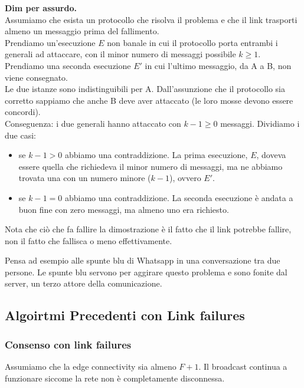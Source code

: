\textbf{Dim per assurdo.}\\
Assumiamo che esista un protocollo che risolva il problema e che il link trasporti almeno un messaggio prima del fallimento. \\
Prendiamo un'esecuzione $E$ non banale in cui il protocollo porta entrambi i generali ad attaccare, con il minor numero di messaggi possibile $k \geq 1$. \\
Prendiamo una seconda esecuzione $E'$ in cui l'ultimo messaggio, da A a B, non viene consegnato. \\
Le due istanze sono indistinguibili per A. Dall'assunzione che il protocollo sia corretto sappiamo che
anche B deve aver attaccato (le loro mosse devono essere concordi). \\
Conseguenza: i due generali hanno attaccato con $k-1 \geq 0$ messaggi.
Dividiamo i due casi:
\begin{itemize}
 \item se $k-1 > 0$ abbiamo una contraddizione. La prima esecuzione, $E$, doveva essere quella che richiedeva il minor numero di messaggi,
 ma ne abbiamo trovata una con un numero minore ($k-1$), ovvero $E'$.
 \item se $k-1 = 0$ abbiamo una contraddizione. La seconda esecuzione è andata a buon fine con zero messaggi, ma almeno uno era richiesto.
\end{itemize}

Nota che ciò che fa fallire la dimostrazione è il fatto che il link potrebbe fallire, non il fatto che fallisca o meno effettivamente.

Pensa ad esempio alle spunte blu di Whatsapp in una conversazione tra due persone. Le spunte blu servono per aggirare questo problema e
sono fonite dal server, un terzo attore della comunicazione.

\subsection{Algoirtmi Precedenti con Link failures}
\subsubsection{Consenso con link failures}

Assumiamo che la edge connectivity sia almeno $F+1$.
Il broadcast continua a funzionare siccome la rete non è completamente disconnessa.

